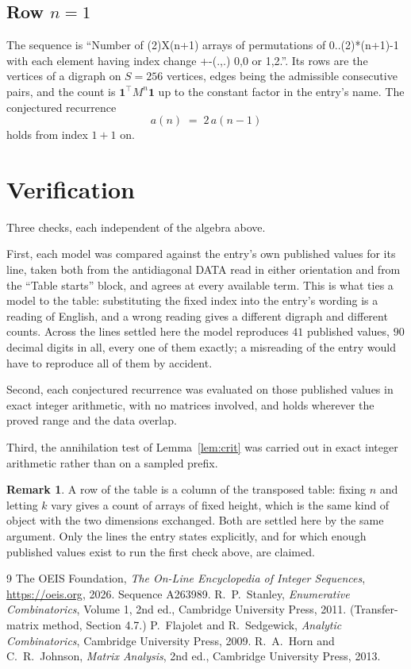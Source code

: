 \documentclass[11pt,a4paper]{article}
\theoremstyle{plain}
\theoremstyle{definition}
\newtheorem{remark}[theorem]{Remark}
\begin{document}
\subsection*{Row $n$$=1$}
The sequence is ``Number of (2)X(n+1) arrays of permutations of 0..(2)*(n+1)-1 with each element having index change +-(.,.) 0,0 or 1,2.''. Its rows are the vertices of a digraph on
$S=256$ vertices, edges being the admissible consecutive pairs, and the count is
$\mathbf{1}^{\!\top}M^{n}\mathbf{1}$ up to the constant factor in the entry's name.
The conjectured recurrence
\[
a(n)\;=\;2\,a(n-1)
\]
holds from index $1+1$ on.

\section{Verification}

Three checks, each independent of the algebra above.

First, each model was compared against the entry's own published values for its line, taken
both from the antidiagonal DATA read in either orientation and from the ``Table starts''
block, and agrees at every available term. This is what ties a model to the table:
substituting the fixed index into the entry's wording is a reading of English, and a wrong
reading gives a different digraph and different counts. Across the lines settled here the
model reproduces $41$ published values, $90$ decimal digits in all, every one of
them exactly; a misreading of the entry would have to reproduce all of them by accident.

Second, each conjectured recurrence was evaluated on those published values in exact
integer arithmetic, with no matrices involved, and holds wherever the proved range and the
data overlap.

Third, the annihilation test of Lemma~\ref{lem:crit} was carried out in exact integer
arithmetic rather than on a sampled prefix.

\begin{remark}
A row of the table is a column of the transposed table: fixing $n$ and letting $k$ vary gives a
count of arrays of fixed height, which is the same kind of object with the two dimensions
exchanged. Both are settled here by the same argument. Only the lines the entry states
explicitly, and for which enough published values exist to run the first check above, are
claimed.
\end{remark}

\begin{thebibliography}{9}
 The OEIS Foundation, \emph{The On-Line Encyclopedia of Integer
Sequences}, \url{https://oeis.org}, 2026. Sequence A263989.
 R.~P.~Stanley, \emph{Enumerative Combinatorics}, Volume 1, 2nd ed.,
Cambridge University Press, 2011. (Transfer-matrix method, Section 4.7.)
 P.~Flajolet and R.~Sedgewick, \emph{Analytic Combinatorics}, Cambridge
University Press, 2009.
 R.~A.~Horn and C.~R.~Johnson, \emph{Matrix Analysis}, 2nd ed., Cambridge
University Press, 2013.
\end{thebibliography}
\end{document}
